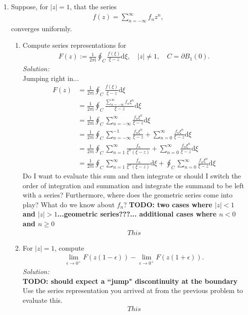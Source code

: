 \documentclass[10pt]{amsart}
\newcommand{\D}{\mathrm{d}}
\newcommand{\I}{\mathrm{i}}
\theoremstyle{nonumberplain}
\begin{document}
\begin{enumerate}[label={\bf {\arabic*}:}]
\item Suppose, for $|z| = 1$, that the series
\begin{align*}
f(z) = \sum_{n = -\infty}^\infty f_n z^n,
\end{align*}
converges uniformly.
\begin{enumerate}
\item Compute series representations for
\begin{align*}
F(z) := \frac{1}{2 \pi \I} \oint_{C} \frac{f(\xi)}{\xi - z} \D \xi,
\quad |z| \neq 1, \quad C = \partial B_1(0).
\end{align*}
\textit{Solution:} \\
Jumping right in...
\begin{align*}
F(z) &= \frac{1}{2 \pi \I} \oint_{C} \frac{f(\xi)}{\xi - z} \D \xi \\
	&= \frac{1}{2 \pi \I} \oint_{C} \frac{ \sum_{n = -\infty}^\infty f_n \xi^n }{\xi - z} \D \xi \\
	&= \frac{1}{2 \pi \I} \oint_{C} \sum_{n = -\infty}^\infty \frac{ f_n \xi^n }{\xi - z} \D \xi \\
	&= \frac{1}{2 \pi \I} \oint_{C} \sum_{n = -\infty}^{-1} \frac{ f_n \xi^n }{\xi - z}
		+ \sum_{n = 0}^\infty \frac{ f_n \xi^n }{\xi - z} \D \xi \\
	&= \frac{1}{2 \pi \I} \oint_{C} \sum_{n = 1}^\infty \frac{ f_n }{\xi^n(\xi - z)}
		+ \sum_{n = 0}^\infty \frac{ f_n \xi^n }{\xi - z} \D \xi \\
	&= \frac{1}{2 \pi \I} \oint_{C} \sum_{n = 1}^{\infty} \frac{ f_n }{\xi^n(\xi - z)} \D \xi
		+ \oint_{C} \sum_{n = 0}^\infty \frac{ f_n \xi^n }{\xi - z} \D \xi
\end{align*}
Do I want to evaluate this sum and then integrate or should I switch the order of integration and summation and integrate the summand to be left with a series?
Furthermore, where does the geometric series come into play?
What do we know about $f_n$?
\textbf{TODO: two cases where $|z| < 1$ and $|z| > 1$...geometric series???... additional cases where $n < 0$ and $n \geq 0$}
\begin{align*}
This
\end{align*}

\item For $|z| = 1$, compute
\begin{align*}
\lim_{\epsilon \to 0^+} F( z(1 - \epsilon)) -       \lim_{\epsilon \to 0^+} F( z(1 + \epsilon)) .
\end{align*}
\textit{Solution:} \\
\textbf{TODO: should expect a ``jump" discontinuity at the boundary}
Use the series representation you arrived at from the previous problem to evaluate this.
\begin{align*}
This
\end{align*}

\end{enumerate}
\end{enumerate}
\end{document}
